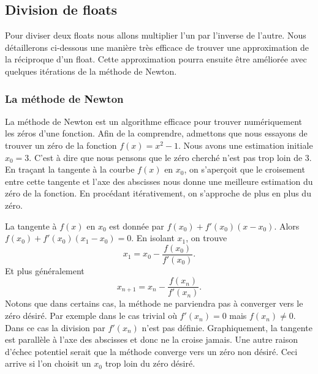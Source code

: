 \documentclass{article}
\begin{document}
\subsection{Division de floats}
Pour diviser deux floats nous allons multiplier l'un par l'inverse de l'autre. Nous détaillerons ci-dessous une manière très efficace de trouver une approximation de la réciproque d'un float. Cette approximation pourra ensuite être améliorée avec quelques itérations de la méthode de Newton.
\subsubsection{La méthode de Newton}
La méthode de Newton est un algorithme efficace pour trouver numériquement les zéros d'une fonction. Afin de la comprendre, admettons que nous essayons de trouver un zéro de la fonction $f(x) = x^2-1$. Nous avons une estimation initiale $x_0 = 3$. C'est à dire que nous pensons que le zéro cherché n'est pas trop loin de 3. En traçant la tangente à la courbe $f(x)$ en $x_0$, on s'aperçoit que le croisement entre cette tangente et l'axe des abscisses nous donne une meilleure estimation du zéro de la fonction. En procédant itérativement, on s'approche de plus en plus du zéro.
\begin{center}
\end{center}
La tangente à $f(x)$ en $x_0$ est donnée par $f(x_0)+f'(x_0)(x-x_0)$. Alors $f(x_0)+f'(x_0)(x_1-x_0) = 0$.
En isolant $x_1$, on trouve
$$
x_1 = x_0-\frac{f(x_0)}{f'(x_0)}.
$$
Et plus généralement
$$
x_{n+1} = x_n-\frac{f(x_n)}{f'(x_n)}.
$$
Notons que dans certains cas, la méthode ne parviendra pas à converger vers le zéro désiré. Par exemple dans le cas trivial où $f'(x_n) = 0$ mais $f(x_n) \not = 0$. Dans ce cas la division par $f'(x_n)$ n'est pas définie. Graphiquement, la tangente est parallèle à l'axe des abscisses et donc ne la croise jamais. Une autre raison d'échec potentiel serait que la méthode converge vers un zéro non désiré. Ceci arrive si l'on choisit un $x_0$ trop loin du zéro désiré.
\end{document}
